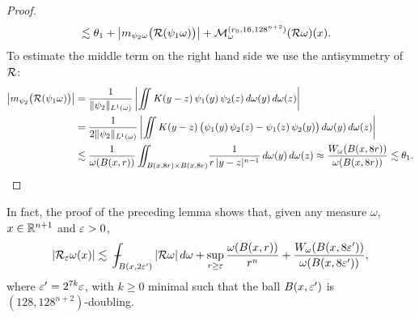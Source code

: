 \begin{proof}
\begin{align*}
& \lesssim\theta_1 +  \bigl|m_{\psi_2\omega}\bigl({\mathcal R}(\psi_1\omega)\bigr)\bigr|
+ {\mathcal M}_\omega^{(r_0,16,128^{n+2})} ({\mathcal R}\omega)(x).
\end{align*}
To estimate the middle term on the right hand side we use the antisymmetry of ${\mathcal R}$:
\begin{align*}
\bigl|m_{\psi_2}\bigl({\mathcal R}(\psi_1\omega)\bigr)\bigr|
& =\frac1{\|\psi_2\|_{L^1(\omega)}} \left|\iint K(y-z)\,\psi_1(y)\,\psi_2(z)\,d\omega(y)\,d\omega(z)\right|\\
& =\frac1{2\|\psi_2\|_{L^1(\omega)}} \left|\iint K(y-z)\,\bigl(\psi_1(y)\,\psi_2(z) - \psi_1(z)\,\psi_2(y)\bigr)\,d\omega(y)\,d\omega(z)\right|\\
& \lesssim \frac1{\omega(B(x,r))} \iint_{B(x,8r)\times B(x,8r)} \!\frac1{r\,|y-z|^{n-1}}\,d\omega(y)\,d\omega(z)
 \approx\frac{W_\omega(B(x,8r))}{\omega(B(x,8r))} \lesssim \theta_1.
\end{align*}
\end{proof}

\vv


\vv
\begin{rem}\label{rem**}
In fact, the proof of the preceding lemma shows that, given any measure $\omega$, $x\in{\mathbb R}^{n+1}$ and
${\varepsilon}>0$,
\begin{equation}\label{eqcotlar*99}
|\RR_\ve\omega(x)|\lesssim \avint_{B(x,2\ve')} |\RR\omega|\,d\omega + \sup_{r\geq \ve} \frac{\omega(B(x,r))}{r^n} + \frac{W_\omega(B(x,8\ve'))}{\omega(B(x,8\ve'))},
\end{equation}
where ${\varepsilon}'=2^{7k}{\varepsilon}$, with $k\geq0$ minimal such that the ball $B(x,{\varepsilon}')$ is $(128,128^{n+2})$-doubling. 
\end{rem}


\vv

